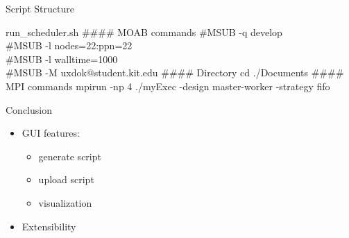 	\begin{frame}{Script Structure}
		
		\begin{block}{run\_scheduler.sh}
		        \#\#\#\# MOAB commands
		        \newline
		        \newline
				\#MSUB  -q develop\\
				\#MSUB  -l nodes=22:ppn=22\\
				\#MSUB  -l walltime=1000\\
				\#MSUB  -M uxdok@student.kit.edu
				\newline
				\newline
        				\#\#\#\# Directory
				\newline
				\newline
				cd ./Documents
				\newline
				\newline
        				\#\#\#\# MPI commands
        			\newline
        			\newline
				mpirun -np 4 ./myExec -design master-worker -strategy fifo
			
		\end{block}
	\end{frame}
	
	
\begin{frame}{Conclusion}
\begin{itemize}
\pause
\item GUI features:
\begin{itemize}
			\pause
			 \item generate script
			 \pause
			 \item upload script
			 \pause
			 \item visualization
\end{itemize}
			
\pause
\item Extensibility
	\end{itemize}
		
	\end{frame}
	